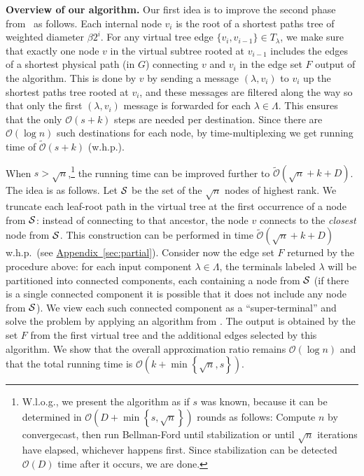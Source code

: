 \documentclass[letterpaper,11pt]{article}
\newcommand{\namedref}[2]{\hyperref[#2]{#1~\ref*{#2}}}
\newcommand{\appendixref}[1]{\namedref{Appendix}{#1}}
\newcommand{\BO}{\mathcal{O}}
\newcommand{\sO}{\tilde{\mathcal{O}}}
\newcommand{\Comp}{\lambda}
\newcommand{\Set}[1]{\left\{#1\right\}}
\renewcommand{\paragraph}[1]{\smallskip\par\noindent\textbf{#1}}
\begin{document}
\paragraph{Overview of our algorithm.}
Our first idea is to improve  the second phase from~\cite{KKMPT-12} as
follows.  Each internal node $v_i$ is the root of a shortest paths
tree of weighted diameter $\beta2^i$.
For  any virtual tree edge
$\{v_i,v_{i-1}\}\in T_{\Comp}$, we
make sure that exactly one node $v$ in the virtual subtree rooted at $v_{i-1}$
includes the edges of a shortest physical path 
(in $G$) connecting $v$ and $v_i$ in the edge set $F$ output of the
algorithm. 
This is done by $v$ by sending  a message $(\Comp,v_i)$ to $v_i$ up
the shortest paths tree rooted at $v_i$, and these messages are
filtered along the way so that only the first 
$(\Comp,v_i)$ message is forwarded for each $\Comp\in \Lambda$.
This ensures that the only $\BO(s+k)$ steps are needed per
destination. 
Since there are $\BO(\log n)$ such destinations for each node, by
time-multiplexing 
we get running time of $\sO(s+k)$ (w.h.p.). 

When $s>\sqrt{n}$,\footnote{W.l.o.g., we present the algorithm as if $s$ was known, because it
  can be determined in $\BO(D+\min\Set{s,\sqrt n})$ rounds as follows:
  Compute $n$ by convergecast, then run Bellman-Ford until
  stabilization or until $\sqrt n$ iterations have elapsed, whichever
  happens first. Since stabilization can be detected $\BO(D)$ time
  after it occurs, we are done.
} 
the running time can be improved further to $\sO(\sqrt{n}+k+D)$. The idea is as
follows. Let ${\cal S}$ be the set of the $\sqrt{n}$ nodes of highest rank.
We truncate each leaf-root path in the virtual tree at the first occurrence of a
node from $\cal S$: instead of connecting to that ancestor, the node $v$
connects to the \emph{closest} node from ${\cal S}$. This construction can be
performed in time $\sO(\sqrt{n}+k+D)$ w.h.p.\ (see \appendixref{sec:partial}).
Consider now the edge set $F$ returned by the procedure above: for each input
component $\Comp\in \Lambda$, the terminals labeled $\Comp$ will be partitioned
into connected components, each containing a node from $\cal S$ (if there is a
single connected component it is possible that it does not include any node from
$\cal S$). We view each such connected component as a ``super-terminal'' and
solve the problem by applying an algorithm from \cite{LenzenP13}. The output is
obtained by the set $F$ from the first virtual tree and the additional edges
selected by this algorithm. We show that the overall approximation ratio remains
$\BO(\log n)$ and that the total running time is
$\BO(k+\min\Set{\sqrt{n},s})$.
\end{document}
